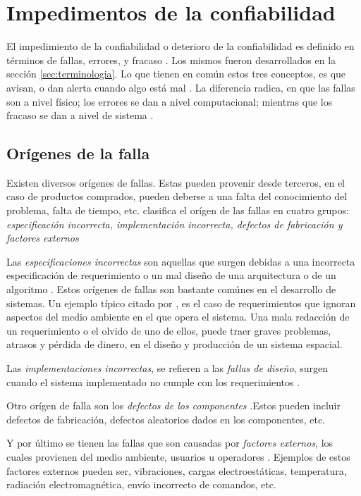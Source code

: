 \section{Impedimentos de la confiabilidad}\label{sec:impedimentos}
El impedimiento de la confiabilidad o deterioro de la confiabilidad es definido en términos de
fallas, errores, y fracaso \citep{FTDesign}. Los mismos fueron desarrollados en la sección
\ref{sec:terminologia}. Lo que tienen en común estos tres conceptos, es que avisan, o dan alerta
cuando algo está mal \citep{FTDesign}. La diferencia radica, en que las fallas son a nivel físico;
los errores se dan a nivel computacional; mientras que los fracaso se dan a nivel de sistema
\citep{FTDesign}.

\subsection{Orígenes de la falla}
Existen diversos orígenes de fallas. Estas pueden provenir desde terceros, en el caso de productos
comprados, pueden deberse a una falta del conocimiento del problema, falta de tiempo, etc.
\cite{FTDesign} clasifica el orígen de las fallas en cuatro grupos: \textit{especificación
incorrecta, implementación incorrecta, defectos de fabricación y factores externos}

Las \textit{especificaciones incorrectas} son aquellas que surgen debidas a una incorrecta
especificación de requerimiento o un mal diseño de una arquitectura o de un algoritmo
\citep{FTDesign}. Estos orígenes de fallas son bastante comúnes en el desarrollo de sistemas. Un
ejemplo típico citado por \cite{FTDesign}, es el caso de requerimientos que ignoran aspectos del
medio ambiente en el que opera el sistema. Una mala redacción de un requerimiento o el olvido de
uno de ellos, puede traer graves problemas, atrasos y pérdida de dinero,  en el diseño y producción
de un sistema espacial.

Las \textit{implementaciones incorrectas}, se refieren a las \textit{fallas de diseño}, surgen
cuando el sistema implementado no cumple con los requerimientos \citep{FTDesign}.

Otro orígen de falla son los \textit{defectos de los componentes} \citep{FTDesign}.Estos pueden
incluir defectos de fabricación, defectos aleatorios dados en los componentes, etc.

Y por último se tienen las fallas que son causadas por \textit{factores externos}, los cuales
provienen del medio ambiente, usuarios u operadores \citep{FTDesign}. Ejemplos de estos factores
externos pueden ser, vibraciones, cargas electroestáticas, temperatura, radiación electromagnética,
envío incorrecto de comandos, etc.

